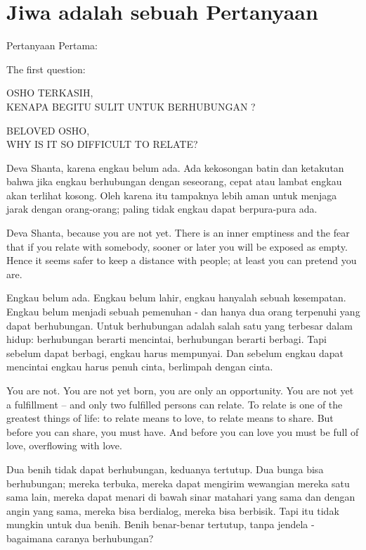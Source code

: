 \chapter{Jiwa adalah sebuah Pertanyaan} %

\bahasa
Pertanyaan Pertama:

\english
The first question:

\bahasa
OSHO TERKASIH,\\
KENAPA BEGITU SULIT UNTUK BERHUBUNGAN ?

\english
BELOVED OSHO,\\
WHY IS IT SO DIFFICULT TO RELATE?

\bahasa
Deva Shanta, karena engkau belum ada. Ada kekosongan batin dan ketakutan bahwa jika engkau berhubungan dengan seseorang, cepat atau lambat engkau akan terlihat kosong. Oleh karena itu tampaknya lebih aman untuk menjaga jarak dengan orang-orang; paling tidak engkau dapat berpura-pura ada.

\english
Deva Shanta, because you are not yet. There is an inner emptiness and the fear that if you relate with somebody, sooner or later you will be exposed as empty. Hence it seems safer to keep a distance with people; at least you can pretend you are.

\bahasa
Engkau belum ada. Engkau belum lahir, engkau hanyalah sebuah kesempatan. Engkau belum menjadi sebuah pemenuhan - dan hanya dua orang terpenuhi yang dapat berhubungan. Untuk berhubungan adalah salah satu yang terbesar dalam hidup: berhubungan berarti mencintai, berhubungan berarti berbagi. Tapi sebelum dapat berbagi, engkau harus mempunyai. Dan sebelum engkau dapat mencintai engkau harus penuh cinta, berlimpah dengan cinta.

\english
You are not. You are not yet born, you are only an opportunity. You are not yet a fulfillment -- and only two fulfilled persons can relate. To relate is one of the greatest things of life: to relate means to love, to relate means to share. But before you can share, you must have. And before you can love you must be full of love, overflowing with love.

\bahasa
Dua benih tidak dapat berhubungan, keduanya tertutup. Dua bunga bisa berhubungan; mereka terbuka, mereka dapat mengirim wewangian mereka satu sama lain, mereka dapat menari di bawah sinar matahari yang sama dan dengan angin yang sama, mereka bisa berdialog, mereka bisa berbisik. Tapi itu tidak mungkin untuk dua benih. Benih benar-benar tertutup, tanpa jendela - bagaimana caranya berhubungan?

